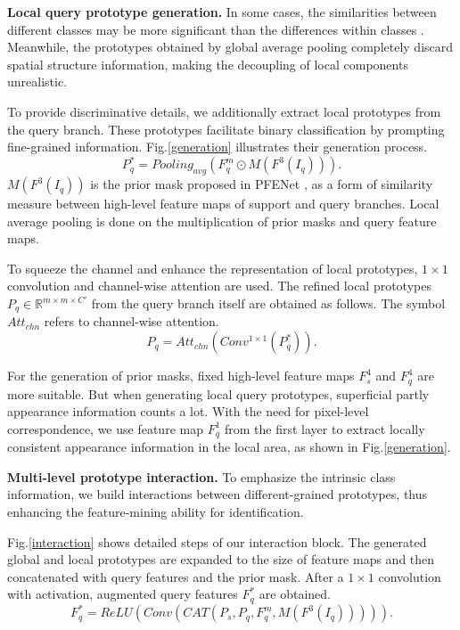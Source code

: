 \documentclass[letterpaper]{article} %
\begin{document}
\textbf{Local query prototype generation.}
In some cases, the similarities between different classes may be more significant than the differences within classes \cite{fan2022self}. Meanwhile, the prototypes obtained by global average pooling completely discard spatial structure information, making the decoupling of local components unrealistic.

To provide discriminative details, we additionally extract local prototypes from the query branch. These prototypes facilitate binary classification by prompting fine-grained information. Fig.\ref{generation} illustrates their generation process.
\begin{equation}
P^*_{q} = Pooling_{avg}(F^{m}_q \odot M(F^3(I_q))).
\end{equation}%
$M(F^3(I_q))$ is the prior mask proposed in PFENet \cite{tian2020prior}, as a form of similarity measure between high-level feature maps of support and query branches. Local average pooling is done on the multiplication of prior masks and query feature maps.

To squeeze the channel and enhance the representation of local prototypes, $1\times1$ convolution and channel-wise attention are used. The refined local prototypes $P_{q} \in \mathbb{R}^{m\times m\times C'}$ from the query branch itself are obtained as follows. The symbol $Att_{chn}$ refers to channel-wise attention.
\begin{equation}
P_{q} = Att_{chn}(Conv^{1\times 1}(P^*_{q})).
\end{equation}%

For the generation of prior masks, fixed high-level feature maps $F^{4}_{s}$ and $F^{4}_{q}$ are more suitable. But when generating local query prototypes, superficial partly appearance information counts a lot. With the need for pixel-level correspondence, we use feature map $F^{1}_{q}$ from the first layer to extract locally consistent appearance information in the local area, as shown in Fig.\ref{generation}.

\textbf{Multi-level prototype interaction.}
To emphasize the intrinsic class information, we build interactions between different-grained prototypes, thus enhancing the feature-mining ability for identification.

Fig.\ref{interaction} shows detailed steps of our interaction block. The generated global and local prototypes are expanded to the size of feature maps and then concatenated with query features and the prior mask. After a $1\times1$ convolution with activation, augmented query features $F^{*}_q$ are obtained.
\begin{equation}
F^{*}_q = ReLU(Conv(CAT(P_s,P_q,F^{m}_q,M(F^3(I_q))))).
\end{equation}%
\end{document}

